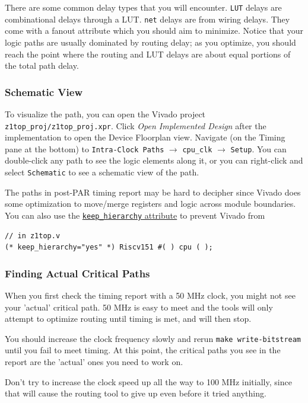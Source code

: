 \documentclass[11pt]{article}
\begin{document}
There are some common delay types that you will encounter.
\verb|LUT| delays are combinational delays through a LUT.
\verb|net| delays are from wiring delays. They come with a fanout attribute which you should aim to minimize.
Notice that your logic paths are usually dominated by routing delay; as you optimize, you should reach the point where the routing and LUT delays are about equal portions of the total path delay.

\subsubsection{Schematic View}
To visualize the path, you can open the Vivado project \verb|z1top_proj/z1top_proj.xpr|.
Click \textit{Open Implemented Design} after the implementation to open the Device Floorplan view.
Navigate (on the Timing pane at the bottom) to \verb|Intra-Clock Paths| $\rightarrow$ \verb|cpu_clk| $\rightarrow$ \verb|Setup|.
You can double-click any path to see the logic elements along it, or you can right-click and select \verb|Schematic| to see a schematic view of the path.

The paths in post-PAR timing report may be hard to decipher since Vivado does some optimization to move/merge registers and logic across module boundaries.
You can also use the \href{https://www.xilinx.com/support/answers/54778.html}{\texttt{keep\_hierarchy} attribute} to prevent Vivado from 

\begin{verbatim}
// in z1top.v
(* keep_hierarchy="yes" *) Riscv151 #( ) cpu ( );
\end{verbatim}

\subsubsection{Finding Actual Critical Paths}
When you first check the timing report with a 50 MHz clock, you might not see your 'actual' critical path.
50 MHz is easy to meet and the tools will only attempt to optimize routing until timing is met, and will then stop.

You should increase the clock frequency slowly and rerun \verb|make write-bitstream| until you fail to meet timing.
At this point, the critical paths you see in the report are the 'actual' ones you need to work on.

Don't try to increase the clock speed up all the way to 100 MHz initially, since that will cause the routing tool to give up even before it tried anything.
\end{document}
